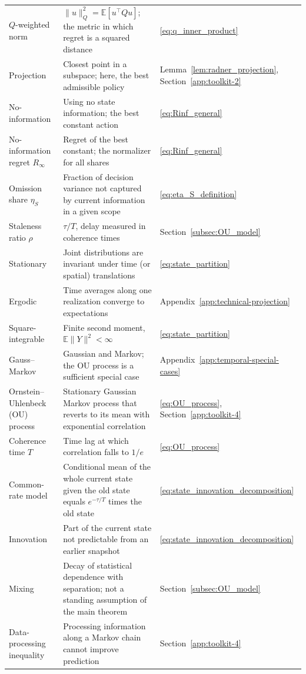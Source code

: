 \begin{longtable}{@{}p{.23\linewidth}p{.52\linewidth}p{.20\linewidth}@{}}
$Q$-weighted norm & $\|u\|_Q^2=\mathbb E[u^\top Qu]$; the metric in which regret is a squared distance & \eqref{eq:q_inner_product} \\
Projection & Closest point in a subspace; here, the best admissible policy & Lemma~\ref{lem:radner_projection}, Section~\ref{app:toolkit-2} \\
No-information & Using no state information; the best constant action & \eqref{eq:Rinf_general} \\
No-information regret $R_\infty$ & Regret of the best constant; the normalizer for all shares & \eqref{eq:Rinf_general} \\
Omission share $\eta_S$ & Fraction of decision variance not captured by current information in a given scope & \eqref{eq:eta_S_definition} \\
Staleness ratio $\rho$ & $\tau/T$, delay measured in coherence times & Section~\ref{subsec:OU_model} \\
Stationary & Joint distributions are invariant under time (or spatial) translations & \eqref{eq:state_partition} \\
Ergodic & Time averages along one realization converge to expectations & Appendix~\ref{app:technical-projection} \\
Square-integrable & Finite second moment, $\mathbb E\|Y\|^2<\infty$ & \eqref{eq:state_partition} \\
Gauss--Markov & Gaussian and Markov; the OU process is a sufficient special case & Appendix~\ref{app:temporal-special-cases} \\
Ornstein--Uhlenbeck (OU) process & Stationary Gaussian Markov process that reverts to its mean with exponential correlation & \eqref{eq:OU_process}, Section~\ref{app:toolkit-4} \\
Coherence time $T$ & Time lag at which correlation falls to $1/e$ & \eqref{eq:OU_process} \\
Common-rate model & Conditional mean of the whole current state given the old state equals $e^{-\tau/T}$ times the old state & \eqref{eq:state_innovation_decomposition} \\
Innovation & Part of the current state not predictable from an earlier snapshot & \eqref{eq:state_innovation_decomposition} \\
Mixing & Decay of statistical dependence with separation; not a standing assumption of the main theorem & Section~\ref{subsec:OU_model} \\
Data-processing inequality & Processing information along a Markov chain cannot improve prediction & Section~\ref{app:toolkit-4} \\

\end{longtable}
